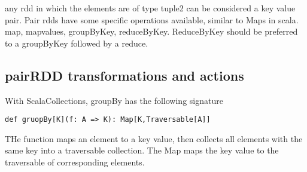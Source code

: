 any rdd in which the elements are of type tuple2 can be considered a key value pair. Pair rdds have some specific operations available, similar to Maps in scala. map, mapvalues, groupByKey, reduceByKey. ReduceByKey should be preferred to a groupByKey followed by a reduce.

\subsection{pairRDD transformations and actions}

With ScalaCollections, groupBy has the following signature
\begin{lstlisting}
def gruopBy[K](f: A => K): Map[K,Traversable[A]]
\end{lstlisting}

THe function maps an element to a key value, then collects all elements with the same key into a traversable collection. The Map maps the key value to the traversable of corresponding elements.
